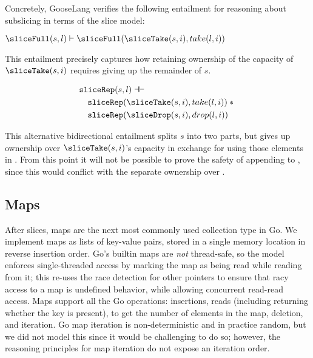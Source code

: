 
Concretely, GooseLang verifies the following entailment for reasoning
about subslicing in terms of the slice model:

$\sliceFull(s, l) \vdash \sliceFull(\sliceTake(s, i), take(l, i))$

This entailment precisely captures how retaining ownership of the
capacity of $\sliceTake(s, i)$ requires giving up the remainder of
$s$.

\begin{align*}
  &\sliceRep(s, l) \dashv\vdash \\
  &\quad \sliceRep(\sliceTake(s, i), take(l, i)) \sep {} \\
  &\quad \sliceRep(\sliceDrop(s, i), drop(l, i))
\end{align*}

This alternative bidirectional entailment splits $s$ into two parts,
but gives up ownership over $\sliceTake(s, i)$'s capacity in exchange
for using those elements in . From this point it will
not be possible to prove the safety of appending to ,
since this would conflict with the separate ownership over
.

\subsection{Maps}


After slices, maps are the next most commonly used collection type in
Go. We implement maps as lists of key-value pairs, stored in a single
memory location in reverse insertion order. Go's builtin maps are
\emph{not} thread-safe, so the model enforces single-threaded access by
marking the map as being read while reading from it; this re-uses the
race detection for other pointers to ensure that racy access to a map is
undefined behavior, while allowing concurrent read-read access. Maps
support all the Go operations: insertions, reads (including returning
whether the key is present),  to get the number of elements
in the map, deletion, and iteration. Go map iteration is
non-deterministic and in practice random, but we did not model this
since it would be challenging to do so; however, the reasoning
principles for map iteration do not expose an iteration order.

